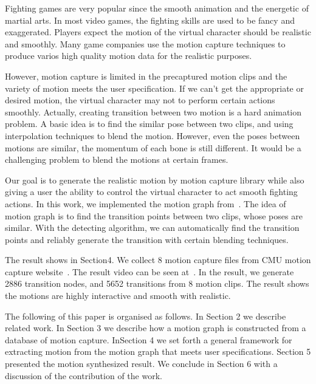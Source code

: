 Fighting games are very popular since the smooth animation and the energetic of martial arts. 
In most video games, the fighting skills are used to be fancy and exaggerated. 
Players expect the motion of the virtual character should be realistic and 
smoothly. Many game companies use the motion capture techniques to produce varios 
high quality motion data for the realistic purposes. 

However, motion capture is limited in the precaptured motion clips and the 
variety of motion meets the user specification. 
If we can't get the appropriate or desired motion, the virtual character may not 
to perform certain actions smoothly.
Actually, creating transition between two motion is a hard animation problem.
A basic idea is to find the similar pose between two clips, and using 
interpolation techniques to blend the motion. However, even the poses between 
motions are similar, the momentum of each bone is still different. 
It would be a challenging problem to blend the motions at certain frames.

Our goal is to generate the realistic motion by motion capture library while 
also giving a user the ability to control the virtual character to act smooth 
fighting actions.
In this work, we implemented the motion graph from~\cite{kovar2002}.
The idea of motion graph is to find the transition points between two clips, 
whose poses are similar. 
With the detecting algorithm, we can automatically find the transition points 
and reliably generate the transition with certain blending techniques.

The result shows in Section4. We collect 8 motion capture files from CMU motion 
capture website~\cite{cmu}. The result video can be seen at~\cite{video}. In the result, we 
generate 2886 transition nodes, and 5652 transitions from 8 motion clips. 
The result shows the motions are highly interactive and smooth with realistic.

The following of this paper is organised  as follows.
In Section 2 we describe related work. In Section 3 we describe how a motion
graph is constructed from a database of motion capture. 
InSection 4 we set forth a general framework for extracting motion from the
motion graph that meets user specifications. 
Section 5 presented the motion synthesized result. We conclude in Section 6 with a
discussion of the contribution of the work.